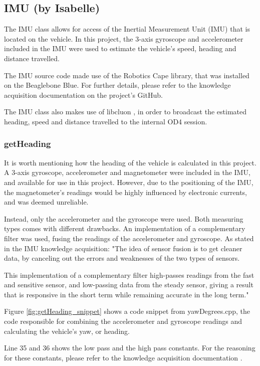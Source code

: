 \documentclass[12pt]{article}
\begin{document}
\subsection{IMU (by Isabelle)} \label{IMU section}
The IMU class allows for access of the Inertial Measurement Unit (IMU) that is located on the vehicle. In this project, the 3-axis gyroscope and accelerometer included in the IMU were used to estimate the vehicle's speed, heading and distance travelled. 

The IMU source code made use of the Robotics Cape library\cite{robotics cape}, that was installed on the Beaglebone Blue. For further details, please refer to the knowledge acquisition documentation\cite{IMU} on the project's GitHub.  

The IMU class also makes use of libcluon \cite{libcluon}, in order to broadcast the estimated heading, speed and distance travelled to the internal OD4 session. 

\subsubsection{getHeading}
It is worth mentioning how the heading of the vehicle is calculated in this project. A 3-axis gyroscope, accelerometer and magnetometer were included in the IMU, and available for use in this project. However, due to the positioning of the IMU, the magnetometer's readings would be highly influenced by electronic currents, and was deemed unreliable. 

Instead, only the accelerometer and the gyroscope were used. Both measuring types comes with different drawbacks. An implementation of a complementary filter was used, fusing the readings of the accelerometer and gyroscope. As stated in the IMU knowledge acquisition: "The idea of sensor fusion is to get cleaner data, by canceling out the errors and weaknesses of the two types of sensors.

This implementation of a complementary filter high-passes readings from the fast and sensitive sensor, and low-passing data from the steady sensor, giving a result that is responsive in the short term while remaining accurate in the long term."\cite{IMU}

Figure \ref{fig:getHeading_snippet} shows a code snippet from yawDegrees.cpp, the code responsible for combining the accelerometer and gyroscope readings and calculating the vehicle's yaw, or heading. 

Line 35 and 36 shows the low pass and the high pass constants. 
For the reasoning for these constants, please refer to the knowledge acquisition documentation \cite{IMU}.
\end{document}
